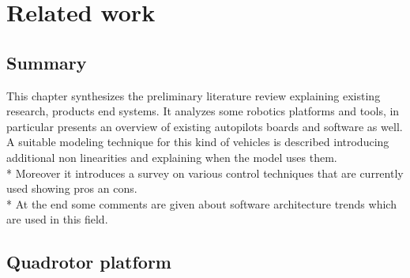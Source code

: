 

\chapter{Related work}
\label{chap:second}
\ifpdf
    \graphicspath{{Chapter2/Figures/PNG/}{Chapter2/Figures/PDF/}{Chapter2/Figures/}}
\else
    \graphicspath{{Chapter2/Figures/EPS/}{Chapter2/Figures/}}
\fi

\section*{Summary}
This chapter synthesizes the preliminary literature review explaining existing research, products end systems. It analyzes some robotics platforms and tools, in particular presents an overview of existing autopilots boards and software as well. A suitable modeling technique for this kind of vehicles is described introducing additional non linearities and explaining when the model uses them.\\*
Moreover it introduces a survey on various control techniques that are currently used showing pros an cons. \\*
At the end some comments are given about software architecture trends which are used in this field. 

\section{Quadrotor platform}


